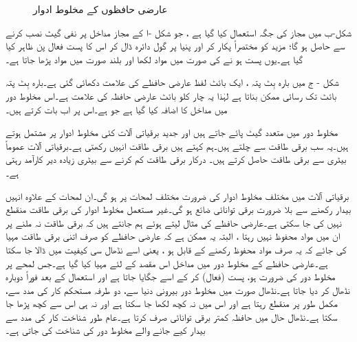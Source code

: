 \begin{figure}
\begin{subfigure}{0.3\textwidth}
\caption{}
\end{subfigure}
\caption{عارضی حافظوں کے مخلوط ادوار}
\label{شکل_حافظہ_عارضی_حافظوں_کے_مخلوط_ادوار}
\end{figure}
شکل-ب میں مجاز کی جگہ  استعمال کیا گیا ہے ، جو شکل -ا کے مجاز مداخل پر نفی گیٹ نصب کرنے سے حاصل ہو گا؛ مزید  کو مختصراً  پکار کر اور  پنیا پر گول دائرہ ڈال کر اس کا پست فعال پن ظاہر کیا گیا ہے۔یوں  پست ہو نے کی صورت میں مواد لکھا اور بلند صورت میں  مواد پڑھا جاتا ہے۔

شکل - ج میں بارہ بِٹ پتہ ، ایک بائٹ لفظ عارضی حافظے کی علامت دکھائی گئی ہے۔بارہ بِٹ پتہ  بائٹ تک رسائی ممکن بناتا ہے لہٰذا یہ چار کلو بائٹ عارضی حافظہ کی علامت ہے۔اس مخلوط دور میں  مداخل کا اضافہ کیا گیا ہے جو ہے۔اس پر اب بات کرتے ہیں۔

 مخلوط دور میں متعدد گیٹ پائے جاتے ہیں اور جدید برقیاتی آلات کئی مخلوط ادوار پر مشتمل ہوتے ہیں۔یہ سب برقی طاقت سے چلتے ہیں۔ہم کہتے ہیں برقی طاقت انہیں  رکھتی ہے۔برقیاتی آلات عموماً بیٹری سے برقی طاقت حاصل کرتے ہیں۔ درکار برقی طاقت کم کرنے سے بیٹری زیادہ دیر کارآمد رہتی ہے۔
 
برقیاتی آلات میں مختلف مخلوط ادوار کی ضرورت مختلف لمحات پر ہو گی۔ان لمحات کے علاوہ انہیں بیدار رکھنے سے بلا ضرورت برقی توانائی ضائع ہو گی۔غیر مستعمل مخلوط ادوار کی برقی طاقت منقطع نہیں کی جا سکتی ہے۔عارضی حافظے کی مثال لیتے ہوئے ہم جانتے ہیں کہ برقی طاقت نہ ملنے پر ان میں مواد محفوظ نہیں رہتا ، البتہ یہ ممکن ہے کہ عارضی حافظے کو صرف اتنی برقی طاقت مہیا کی جائے کہ یہ صرف مواد محفوظ رکھنے کے قابل ہو ، یعنی اسے نڈھال سی کیفیت میں ڈالا جا سکتا ہے۔عارضی حافظے کے مخلوط دور میں  مداخل اس مقصد کے لئے مہیا کیا گیا ہے۔جس لمحے پر مخلوط دور کی ضرورت ہو،  پست (فعال) کر کے اسے جگایا جاتا ہے اور استعمال کے بعد فوراً دوبارہ نڈھال کر دیا جاتا ہے۔نڈھال صورت میں مخلوط دور بیرونی دنیا سے، دو طرفہ مستحکم کار کی مدد سے، مکمل طور پر منقطع رہتا ہے اور اس میں نہ کچھ لکھا جا سکتا ہے اور نہ ہی اس سے کچھ پڑھا جا سکتا ہے۔نڈھال حال میں حافظہ کمتر برقی توانائی صرف کرتا ہے۔عام طور شناخت کار کی مدد سے بیدار کیے جانے والے مخلوط دور کی شناخت کی جاتی ہے۔


